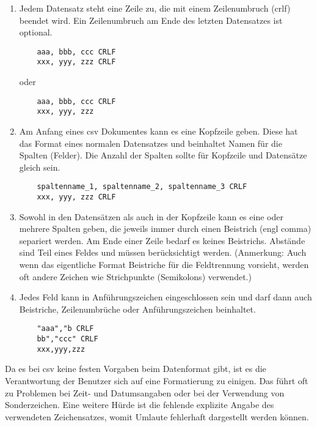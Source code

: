 \begin{enumerate}{}
	
	\item Jedem Datensatz steht eine Zeile zu, die mit einem Zeilenumbruch (\ac{crlf}) beendet wird. Ein Zeilenumbruch am Ende des letzten Datensatzes ist optional. \zB 
	\begin{lstlisting}
	aaa, bbb, ccc CRLF
	xxx, yyy, zzz CRLF
	\end{lstlisting}
	oder
	\begin{lstlisting}
	aaa, bbb, ccc CRLF
	xxx, yyy, zzz
	\end{lstlisting}
	
	\item Am Anfang eines \acs{csv} Dokumentes kann es eine Kopfzeile geben. Diese hat das Format eines normalen Datensatzes und beinhaltet Namen für die Spalten (Felder). Die Anzahl der Spalten sollte für Kopfzeile und Datensätze gleich sein. \zB
	\begin{lstlisting}
	spaltenname_1, spaltenname_2, spaltenname_3 CRLF
	xxx, yyy, zzz CRLF
	\end{lstlisting} %
	
	\item Sowohl in den Datensätzen als auch in der Kopfzeile kann es eine oder mehrere Spalten geben, die jeweils immer durch einen Beistrich (\acs{engl} comma) separiert werden. Am Ende einer Zeile bedarf es keines Beistrichs. Abstände sind Teil eines Feldes und müssen berücksichtigt werden. (Anmerkung: Auch wenn das eigentliche Format Beistriche für die Feldtrennung vorsieht, werden oft andere Zeichen wie \zB Strichpunkte (Semikolons) verwendet.)
	
	\item Jedes Feld kann in Anführungszeichen eingeschlossen sein und darf dann auch Beistriche, Zeilenumbrüche oder Anführungszeichen beinhaltet. \zB
	\begin{lstlisting}
	"aaa","b CRLF
	bb","ccc" CRLF
	xxx,yyy,zzz
	\end{lstlisting}
	
\end{enumerate}

Da es bei \acs{csv} keine festen Vorgaben beim Datenformat gibt, ist es die Verantwortung der Benutzer sich auf eine Formatierung zu einigen. Das führt oft zu Problemen bei Zeit- und Datumsangaben oder bei der Verwendung von Sonderzeichen. Eine weitere Hürde ist die fehlende explizite Angabe des verwendeten Zeichensatzes, womit \zB Umlaute fehlerhaft dargestellt werden können. \cite[vgl.][]{FuchsMediaSolutions:o.J.}


